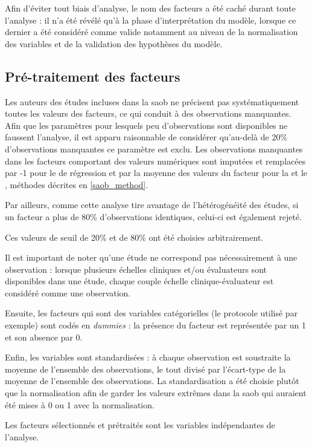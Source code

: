 Afin d'éviter tout biais d'analyse, le nom des facteurs a été caché durant toute l'analyse : il n'a été révélé qu'à la phase d'interprétation du modèle, lorsque ce dernier a été considéré 
comme valide notamment au niveau de la normalisation des variables et de la validation des hypothèses du modèle.  

\subsection{Pré-traitement des facteurs} \label{preprocessing}

Les auteurs des études incluses dans la \gls{saob} ne précisent pas systématiquement toutes les valeurs des facteurs, ce qui conduit à des observations manquantes. 
Afin que les paramètres pour lesquels peu d'observations sont disponibles ne faussent l'analyse, il est apparu raisonnable de considérer qu'au-delà de 20\%
d'observations manquantes ce paramètre est exclu. Les observations manquantes dans les facteurs comportant des valeurs numériques sont 
imputées et remplacées par -1 pour le  de régression et par la moyenne des valeurs du facteur pour la  et le , méthodes décrites en \ref{saob_method}. 

Par ailleurs, comme cette analyse tire avantage de l'hétérogénéité des études, si un facteur a plus de 80\% d'observations identiques, 
celui-ci est également rejeté. 

Ces valeurs de seuil de 20\% et de 80\% ont été choisies arbitrairement.

Il est important de noter qu'une étude ne correspond pas nécessairement à une observation : lorsque plusieurs échelles cliniques et/ou évaluateurs sont disponibles dans une étude,
chaque couple échelle clinique-évaluateur est considéré comme une observation.

Ensuite, les facteurs qui sont des variables catégorielles (le protocole utilisé par exemple) sont codés en \textit{dummies} : la présence du facteur est représentée par un 1 et son absence par 0. 

Enfin, les variables sont standardisées : à chaque observation est soustraite la moyenne de l'ensemble des observations, le tout divisé par l'écart-type de la moyenne de 
l'ensemble des observations. La standardisation a été choisie plutôt que la normalisation afin de garder les valeurs extrêmes dans la \gls{saob} qui auraient été mises à 0 ou 1 avec 
la normalisation. 

Les facteurs sélectionnés et prétraités sont les variables indépendantes de l'analyse.


